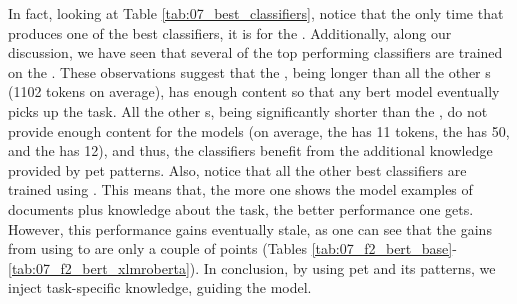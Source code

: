 In fact, looking at Table \ref{tab:07_best_classifiers}, notice that the only time that  \finetuning{} produces one of the best classifiers, it is for the \trafilaturaFulltext{}. Additionally, along our discussion, we have seen that several of the top performing classifiers are trained on the \trafilaturaFulltext{}. These observations suggest that the \trafilaturaFulltext{}, being longer than all the other \contentType{}s (1102 tokens on average), has enough content so that any \gls{bert} model eventually picks up the task.
All the other \contentType{}s, being significantly shorter than the \trafilaturaFulltext{}, do not provide enough content for the models (on average, the \trafilaturaTitle{} has 11 tokens, the \trafilaturaAbstract{} has 50, and the \translationTitle{} has 12), and thus, the classifiers benefit from the additional knowledge provided by \gls{pet} patterns.
Also, notice that all the other best classifiers are trained using \petThousand{}. This means that, the more one shows the model examples of documents plus knowledge about the task, the better performance one gets. However, this performance gains eventually stale, as one can see that the gains from using \petFiveHundred{} to \petThousand{} are only a couple of points (Tables \ref{tab:07_f2_bert_base}-\ref{tab:07_f2_bert_xlmroberta}).
In conclusion, by using \gls{pet} and its patterns, we inject task-specific knowledge, guiding the model. 


\clearpage